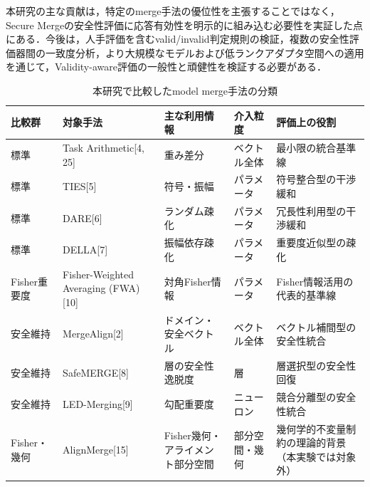 \documentclass{article}
\begin{document}
本研究の主な貢献は，特定のmerge手法の優位性を主張することではなく，Secure Mergeの安全性評価に応答有効性を明示的に組み込む必要性を実証した点にある．今後は，人手評価を含むvalid/invalid判定規則の検証，複数の安全性評価器間の一致度分析，より大規模なモデルおよび低ランクアダプタ空間への適用を通じて，Validity-aware評価の一般性と頑健性を検証する必要がある．


\begin{table}[t]
\centering
\caption{本研究で比較したmodel merge手法の分類}
\label{tab:baseline_methods}
\small
\begin{tabular}{p{1.8cm}p{2.6cm}p{2.8cm}p{2.3cm}p{4.3cm}}
\toprule
比較群 & 対象手法 & 主な利用情報 & 介入粒度 & 評価上の役割 \\
\midrule
標準 & Task Arithmetic[4, 25] & 重み差分 & ベクトル全体 & 最小限の統合基準線 \\
標準 & TIES[5] & 符号・振幅 & パラメータ & 符号整合型の干渉緩和 \\
標準 & DARE[6] & ランダム疎化 & パラメータ & 冗長性利用型の干渉緩和 \\
標準 & DELLA[7] & 振幅依存疎化 & パラメータ & 重要度近似型の疎化 \\
Fisher重要度 & Fisher-Weighted Averaging (FWA)[10] & 対角Fisher情報 & パラメータ & Fisher情報活用の代表的基準線 \\
安全維持 & MergeAlign[2] & ドメイン・安全ベクトル & ベクトル全体 & ベクトル補間型の安全性統合 \\
安全維持 & SafeMERGE[8] & 層の安全性逸脱度 & 層 & 層選択型の安全性回復 \\
安全維持 & LED-Merging[9] & 勾配重要度 & ニューロン & 競合分離型の安全性統合 \\
Fisher・幾何 & AlignMerge[15] & Fisher幾何・アライメント部分空間 & 部分空間・幾何 & 幾何学的不変量制約の理論的背景（本実験では対象外） \\
\bottomrule
\end{tabular}
\end{table}
\end{document}
